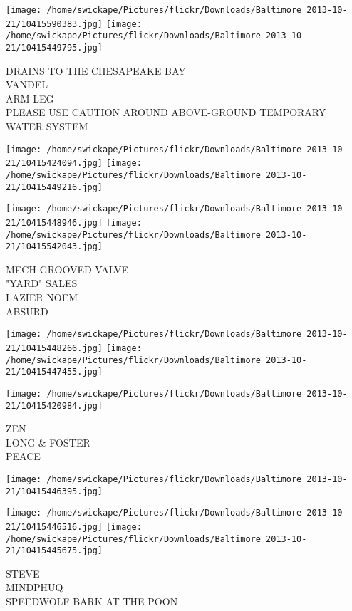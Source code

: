 \documentclass[10pt,letterpaper]{article}
\begin{document}
\texttt{[image: /home/swickape/Pictures/flickr/Downloads/Baltimore 2013-10-21/10415590383.jpg]}
\texttt{[image: /home/swickape/Pictures/flickr/Downloads/Baltimore 2013-10-21/10415449795.jpg]}

DRAINS TO THE CHESAPEAKE BAY\\
VANDEL\\
ARM LEG\\
PLEASE USE CAUTION AROUND ABOVE{-}GROUND TEMPORARY WATER SYSTEM\\
\pagebreak

\texttt{[image: /home/swickape/Pictures/flickr/Downloads/Baltimore 2013-10-21/10415424094.jpg]}
\texttt{[image: /home/swickape/Pictures/flickr/Downloads/Baltimore 2013-10-21/10415449216.jpg]}

\texttt{[image: /home/swickape/Pictures/flickr/Downloads/Baltimore 2013-10-21/10415448946.jpg]}
\texttt{[image: /home/swickape/Pictures/flickr/Downloads/Baltimore 2013-10-21/10415542043.jpg]}

MECH GROOVED VALVE\\
"YARD" SALES\\
LAZIER NOEM\\
ABSURD\\
\pagebreak

\texttt{[image: /home/swickape/Pictures/flickr/Downloads/Baltimore 2013-10-21/10415448266.jpg]}
\texttt{[image: /home/swickape/Pictures/flickr/Downloads/Baltimore 2013-10-21/10415447455.jpg]}

\texttt{[image: /home/swickape/Pictures/flickr/Downloads/Baltimore 2013-10-21/10415420984.jpg]}

ZEN\\
LONG \& FOSTER\\
PEACE\\
\pagebreak

\texttt{[image: /home/swickape/Pictures/flickr/Downloads/Baltimore 2013-10-21/10415446395.jpg]}

\vspace{0.25in}
\texttt{[image: /home/swickape/Pictures/flickr/Downloads/Baltimore 2013-10-21/10415446516.jpg]}
\texttt{[image: /home/swickape/Pictures/flickr/Downloads/Baltimore 2013-10-21/10415445675.jpg]}

STEVE\\
MINDPHUQ\\
SPEEDWOLF BARK AT THE POON\\
\pagebreak
\end{document}

